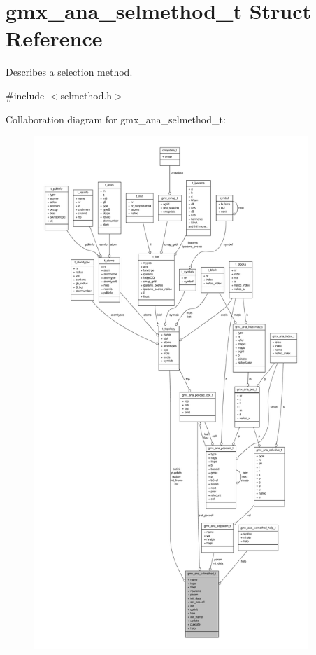 \hypertarget{structgmx__ana__selmethod__t}{\section{gmx\-\_\-ana\-\_\-selmethod\-\_\-t \-Struct \-Reference}
\label{structgmx__ana__selmethod__t}
}


\-Describes a selection method.  




{\ttfamily \#include $<$selmethod.\-h$>$}



\-Collaboration diagram for gmx\-\_\-ana\-\_\-selmethod\-\_\-t\-:
\nopagebreak
\begin{figure}[H]
\begin{center}
\leavevmode
\includegraphics[height=550pt]{structgmx__ana__selmethod__t__coll__graph}
\end{center}
\end{figure}
